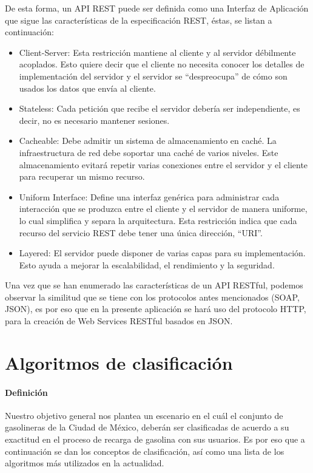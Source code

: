 De esta forma, un API REST puede ser definida como una Interfaz de Aplicación que sigue las características de la especificación REST, éstas, se listan a continuación:
\begin{itemize}
	\item Client-Server:  Esta restricción mantiene al cliente y al servidor débilmente acoplados. Esto quiere decir que el cliente no necesita conocer los detalles de implementación del servidor  y el servidor se “despreocupa” de cómo son usados los datos que envía al cliente.
	\item Stateless:  Cada petición que recibe el servidor debería ser independiente, es decir, no es necesario mantener sesiones.
	\item Cacheable: Debe admitir un sistema de almacenamiento en caché. La infraestructura de red debe soportar una caché de varios niveles. Este almacenamiento evitará repetir varias conexiones entre el servidor y el cliente para recuperar un mismo recurso.
	\item Uniform Interface: Define una interfaz genérica para administrar cada interacción que se produzca entre el cliente y el servidor de manera uniforme, lo cual simplifica y separa la arquitectura. Esta restricción indica que cada recurso del servicio REST debe tener una única dirección, “URI”.
	\item Layered: El servidor puede disponer de varias capas para su implementación. Esto ayuda a mejorar la escalabilidad, el rendimiento y la seguridad.
\end{itemize}
Una vez que se han enumerado las características de un API RESTful, podemos observar la similitud que se tiene con los protocolos antes mencionados (SOAP, JSON), es por eso que en la presente aplicación se hará uso del protocolo HTTP, para la creación de Web Services RESTful basados en JSON.


\section{Algoritmos de clasificación}
\paragraph{Definición} Nuestro objetivo general nos plantea un escenario en el cuál el conjunto de gasolineras de la Ciudad de México, deberán ser clasificadas de acuerdo a su exactitud en el proceso de recarga de gasolina con sus usuarios. Es por eso que a continuación se dan los conceptos de clasificación, así como una lista de los algoritmos más utilizados en la actualidad.

